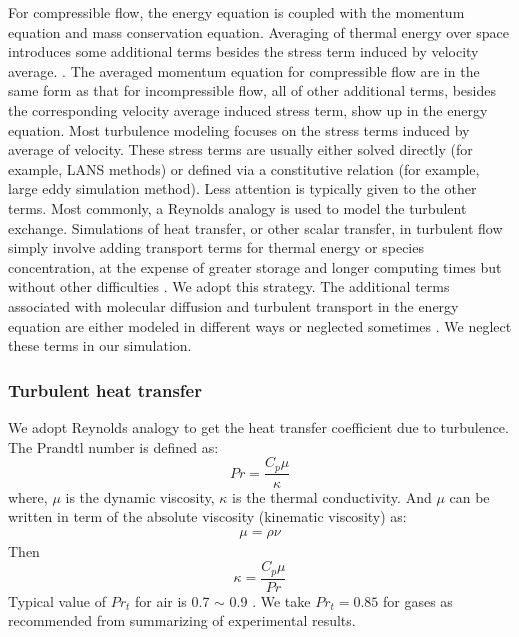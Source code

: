 \documentclass[gmd, manuscript]{copernicus}
\begin{document}
For compressible flow, the energy equation is coupled with the momentum equation and mass conservation equation. Averaging of thermal energy over space introduces some additional terms besides the stress term induced by velocity average. \citep{NASACompressibleTurbulence}. The averaged momentum equation for compressible flow are in the same form as that for incompressible flow, all of other additional terms, besides the corresponding velocity average induced stress term, show up in the energy equation. Most turbulence modeling focuses on the stress terms induced by average of velocity. These stress terms are usually either solved directly (for example, LANS methods) or defined via a constitutive relation (for example, large eddy simulation method). Less attention is typically given to the other terms. Most commonly, a Reynolds analogy is used to model the turbulent exchange. Simulations of heat transfer, or other scalar transfer, in turbulent flow simply involve adding transport terms for thermal energy or species concentration, at the expense of greater storage and longer computing times but without other difficulties \citep{cebeci2013analysis}. We adopt this strategy. %
The additional terms associated with molecular diffusion and turbulent transport in the energy equation are either modeled in different ways or neglected sometimes \citep{NASACompressibleTurbulence}. We neglect these terms in our simulation.

\subsubsection{Turbulent heat transfer}
We adopt Reynolds analogy to get the heat transfer coefficient due to turbulence.
The Prandtl number is defined as:
\begin{equation}
Pr=\dfrac{C_p \mu}{\kappa}
\end{equation}
where, $\mu$ is the dynamic viscosity, $\kappa$ is the thermal conductivity. And $\mu$  can be written in term of the absolute viscosity (kinematic viscosity) as:
\begin{align}
\mu=\rho \nu
\end{align}
Then
\begin{equation}
\kappa=\dfrac{C_p \mu}{Pr}
\end{equation}
Typical value of $Pr_t$ for air is 0.7 $\sim$ 0.9 . We take $Pr_t=0.85$ for gases as recommended \citet{kays1994turbulent} from summarizing of experimental results. 
\end{document}
